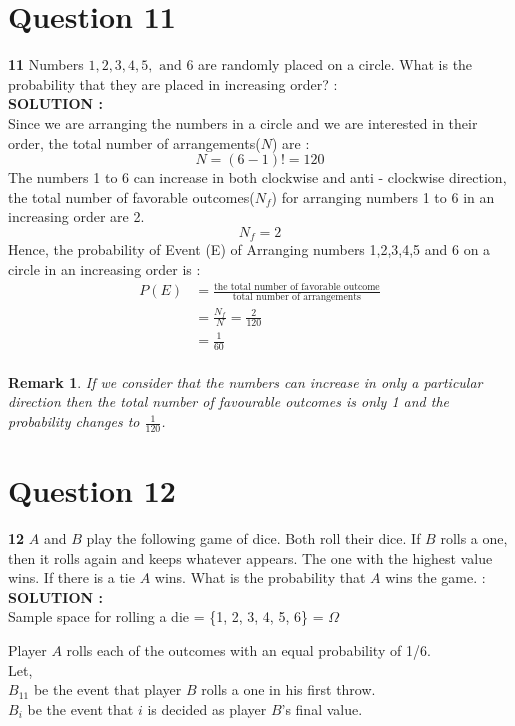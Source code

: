\documentclass{article}
\newtheorem*{remark}{Remark}
\begin{document}
\section{Question 11}
\label{Q11}
\textbf{11} Numbers $1, 2, 3, 4, 5, \text{ and } 6$ are randomly placed on a circle. What is the probability that they are placed in increasing order?  : \\

\hspace{1em} \large{\textbf{SOLUTION :}} \\
Since we are arranging the numbers in a circle and we are interested in their order, the total number of arrangements($N$) are :
$$ N = (6-1)! = 120$$
The numbers 1 to 6 can increase in both clockwise and anti - clockwise direction, the total number of favorable outcomes($N_f$) for arranging numbers 1 to 6 in an increasing order are 2.
$$ N_f  = 2 $$
Hence, the probability of Event (E) of Arranging numbers 1,2,3,4,5 and 6 on a circle in an increasing order is :
\begin{align*}
	P(E) &= \frac{\text{the total number of favorable outcome}}{\text{total number of arrangements}} \\
	&= \frac{N_f}{N} = \frac{2}{120} \\
	&= \frac{1}{60} \\
\end{align*}
\begin{remark}
If we consider that the numbers can increase in only a particular direction then the total number of favourable outcomes is only 1 and the probability changes to $\frac{1}{120}$.
\end{remark}
\section{Question 12}
\label{Q12}
\textbf{12} $A$ and $B$ play the following game of dice. Both roll their dice. If $B$ rolls a one, then it rolls again and keeps whatever appears. The one with the highest value wins. If there is a tie $A$ wins. What is the probability that $A$ wins the game. : \\

\hspace{1em} \large{\textbf{SOLUTION :}} \\
Sample space for rolling a die = \{1, 2, 3, 4, 5, 6\} = $\Omega$
    
    Player $A$ rolls each of the outcomes with an equal probability of 1/6.\\
    Let,\\
    $B_{11}$ be the event that player $B$ rolls a one in his first throw.\\
    $B_i$ be the event that $i$ is decided as player $B$'s final value.\\
    
\end{document}
